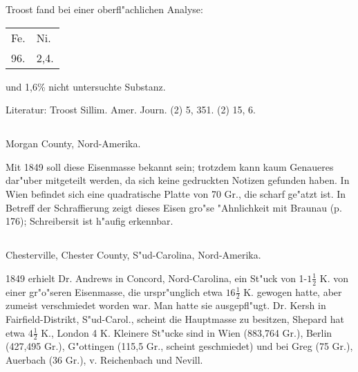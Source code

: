 \documentclass[a4paper, 11pt, oneside]{article}
\begin{document}
Troost fand bei einer oberfl"achlichen Analyse:
\begin{table}[H]
    \centering\swabfamily\Large
    \begin{tabular}{l l}
        Fe. & Ni. \\
        96. & 2,4. \\
    \end{tabular}
\end{table}

und 1,6\% nicht untersuchte Substanz.

\normalsize
Literatur: Troost Sillim. Amer. Journ. (2) 5, 351. (2) 15, 6.

\subsection{}
\LARGE
\paragraph{}
Morgan County, Nord-Amerika.

Mit 1849 soll diese Eisenmasse bekannt sein; trotzdem kann kaum Genaueres dar"uber mitgeteilt werden, da sich keine gedruckten Notizen gefunden haben. In Wien befindet sich eine quadratische Platte von 70 Gr., die scharf ge"atzt ist. In Betreff der Schraffierung zeigt dieses Eisen gro"se "Ahnlichkeit mit Braunau (p. 176); Schreibersit ist h"aufig erkennbar.

\subsection{}
\paragraph{}
Chesterville, Chester County, S"ud-Carolina, Nord-Amerika.

1849 erhielt Dr. Andrews in Concord, Nord-Carolina, ein St"uck von 1-$\mathfrak{1\frac{1}{2}}$ K. von einer gr"o"seren Eisenmasse, die urspr"unglich etwa $\mathfrak{16\frac{1}{2}}$ K. gewogen hatte, aber zumeist verschmiedet worden war. Man hatte sie ausgepfl"ugt. Dr. Kersh in Fairfield-Distrikt, S"ud-Carol., scheint die Hauptmasse zu besitzen, Shepard hat etwa $\mathfrak{4\frac{1}{2}}$ K., London 4 K. Kleinere St"ucke sind in Wien (883,764 Gr.), Berlin (427,495 Gr.), G"ottingen (115,5 Gr., scheint geschmiedet) und bei Greg (75 Gr.), Auerbach (36 Gr.), v. Reichenbach und Nevill.
\end{document}
